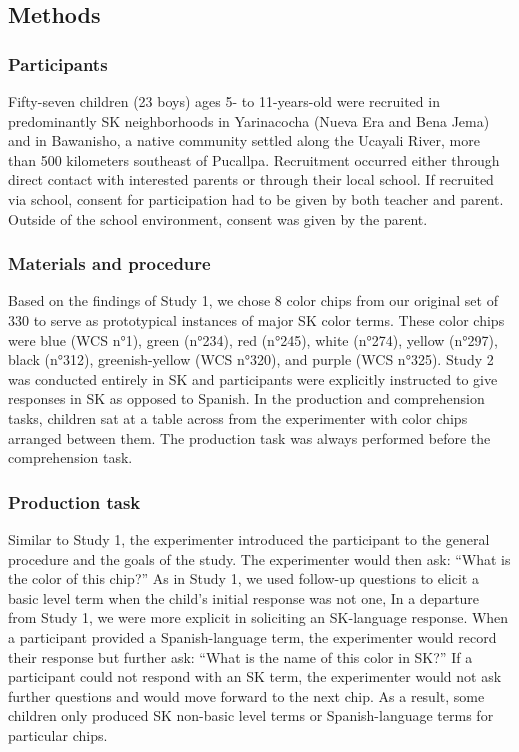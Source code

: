 \documentclass[
  english,
  ,apa7,floatsintext]{apa6}
\begin{document}
\hypertarget{methods-1}{%
\subsection{Methods}\label{methods-1}}

\hypertarget{participants-1}{%
\subsubsection{Participants}\label{participants-1}}

Fifty-seven children (23 boys) ages 5- to 11-years-old were recruited in predominantly SK neighborhoods in Yarinacocha (Nueva Era and Bena Jema) and in Bawanisho, a native community settled along the Ucayali River, more than 500 kilometers southeast of Pucallpa. Recruitment occurred either through direct contact with interested parents or through their local school. If recruited via school, consent for participation had to be given by both teacher and parent. Outside of the school environment, consent was given by the parent.

\hypertarget{materials-and-procedure-1}{%
\subsubsection{Materials and procedure}\label{materials-and-procedure-1}}

Based on the findings of Study 1, we chose 8 color chips from our original set of 330 to serve as prototypical instances of major SK color terms. These color chips were blue (WCS n°1), green (n°234), red (n°245), white (n°274), yellow (n°297), black (n°312), greenish-yellow (WCS n°320), and purple (WCS n°325). Study 2 was conducted entirely in SK and participants were explicitly instructed to give responses in SK as opposed to Spanish. In the production and comprehension tasks, children sat at a table across from the experimenter with color chips arranged between them. The production task was always performed before the comprehension task.

\hypertarget{production-task}{%
\subsubsection{Production task}\label{production-task}}

Similar to Study 1, the experimenter introduced the participant to the general procedure and the goals of the study. The experimenter would then ask: ``What is the color of this chip?'' As in Study 1, we used follow-up questions to elicit a basic level term when the child's initial response was not one, In a departure from Study 1, we were more explicit in soliciting an SK-language response. When a participant provided a Spanish-language term, the experimenter would record their response but further ask: ``What is the name of this color in SK?'' If a participant could not respond with an SK term, the experimenter would not ask further questions and would move forward to the next chip. As a result, some children only produced SK non-basic level terms or Spanish-language terms for particular chips.
\end{document}
